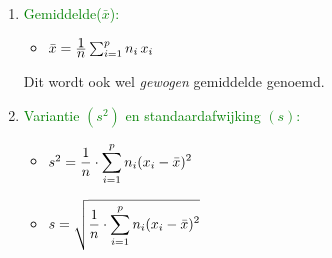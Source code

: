 \begin{enumerate}
\item\textcolor{green}{\hypertarget{gemiddelde}{Gemiddelde($\bar{x}$):}}\label{gemiddelde}
\begin{itemize}
\item $\bar{x}=\frac{\displaystyle 1}{\displaystyle n}\sum_{i=1}^{p}{n_i\,x_i}$
\end{itemize}
Dit wordt ook wel {\it gewogen} gemiddelde genoemd.
\item\textcolor{green}{Variantie $(s^2)$ en \hypertarget{afwijking}{standaardafwijking $(s)$:}}\label{afwijking}
\begin{itemize}
\item $s^2=\displaystyle\frac{\displaystyle 1}{\displaystyle n}\cdot\sum_{i=1}^{p}{n_i(x_i-\bar{x})^2}$
\item $s=\sqrt{\displaystyle\frac{\displaystyle 1}{\displaystyle n}\cdot\sum_{i=1}^{p}{n_i(x_i-\bar{x})^2}}$
\end{itemize}
\end{enumerate}%



